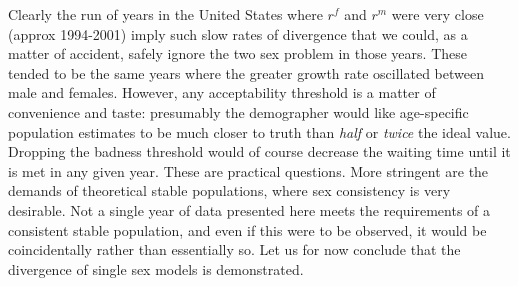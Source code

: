 Clearly the run of years in the United States where $r^f$ and $r^m$ were very
close (approx 1994-2001) imply such slow rates of divergence that we could, as a
matter of accident, safely ignore the two sex problem in those years. These
tended to be the same years where the greater growth rate oscillated between
male and females. However, any acceptability threshold is a matter of
convenience and taste: presumably the demographer would like age-specific 
population estimates to be much closer to truth than \textit{half} or \textit{twice} the ideal value.
Dropping the badness threshold would of course decrease the waiting time until
it is met in any given year. These are practical questions. More
stringent are the demands of theoretical stable populations, where
sex consistency is very desirable. Not a single year of data presented here
meets the requirements of a consistent stable population, and even if this were
to be observed, it would be coincidentally rather than essentially so. Let us
for now conclude that the divergence of single sex models is demonstrated.











